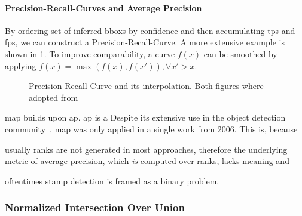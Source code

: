 \paragraph{Precision-Recall-Curves and Average Precision}\label{par:precision-recall-curves-ap}
By ordering set of inferred \glspl{bbox} by confidence and then accumulating
\glspl{tp} and \glspl{fp}, we can construct a Precision-Recall-Curve.
A more extensive example is shown in \cref{fig:precision-recall-curve}.
To improve comparability, a curve \(f(x)\) can be smoothed by applying
\(f(x) = \max (f(x), f(x')), \forall x' > x\). 

\begin{figure}[!tpb]
    \center
    \caption[short={Precision-Recall-Curve}]{Precision-Recall-Curve and its
    interpolation. Both figures where adopted from~\cite{Padilla.2019}}
    \label{fig:precision-recall-curve}
\end{figure}

\Gls{map} builds upon \gls{ap}. \Gls{ap} is a 
Despite its extensive use in the object detection community~\cite{Liu.2016,Ren.20150604}, 
\Gls{map} was only applied in a single work \cite{Zhu.2006} from 2006. This is,
because 
\begin{enumerate*}[i.)]
    \item usually ranks are not generated in most approaches, therefore the 
    underlying metric of average precision, which \textit{is} computed over ranks, 
    lacks meaning and
    \item oftentimes stamp detection is framed as a binary problem.
\end{enumerate*} 

\subsubsection{Normalized Intersection Over Union}\label{subsect:normalized-iou}
\blindtext[1]

